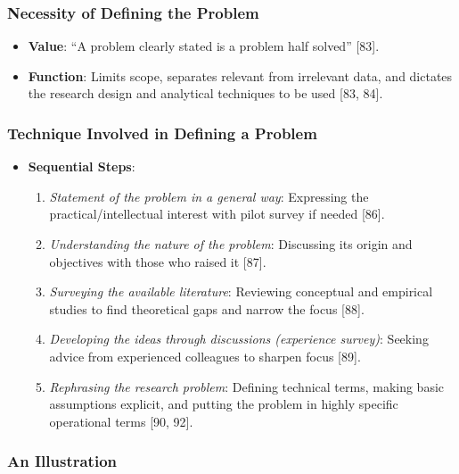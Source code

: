 \documentclass[
]{article}
\providecommand{\tightlist}{%
  \setlength{\itemsep}{0pt}\setlength{\parskip}{0pt}}
\begin{document}
\subsubsection{Necessity of Defining the
Problem}\label{necessity-of-defining-the-problem}

\begin{itemize}
\tightlist
\item
  \textbf{Value}: ``A problem clearly stated is a problem half solved''
  {[}83{]}.
\item
  \textbf{Function}: Limits scope, separates relevant from irrelevant
  data, and dictates the research design and analytical techniques to be
  used {[}83, 84{]}.
\end{itemize}

\subsubsection{Technique Involved in Defining a
Problem}\label{technique-involved-in-defining-a-problem}

\begin{itemize}
\tightlist
\item
  \textbf{Sequential Steps}:

  \begin{enumerate}
  \def\labelenumi{\arabic{enumi}.}
  \tightlist
  \item
    \emph{Statement of the problem in a general way}: Expressing the
    practical/intellectual interest with pilot survey if needed
    {[}86{]}.
  \item
    \emph{Understanding the nature of the problem}: Discussing its
    origin and objectives with those who raised it {[}87{]}.
  \item
    \emph{Surveying the available literature}: Reviewing conceptual and
    empirical studies to find theoretical gaps and narrow the focus
    {[}88{]}.
  \item
    \emph{Developing the ideas through discussions (experience survey)}:
    Seeking advice from experienced colleagues to sharpen focus
    {[}89{]}.
  \item
    \emph{Rephrasing the research problem}: Defining technical terms,
    making basic assumptions explicit, and putting the problem in highly
    specific operational terms {[}90, 92{]}.
  \end{enumerate}
\end{itemize}

\subsubsection{An Illustration}\label{an-illustration}
\end{document}
